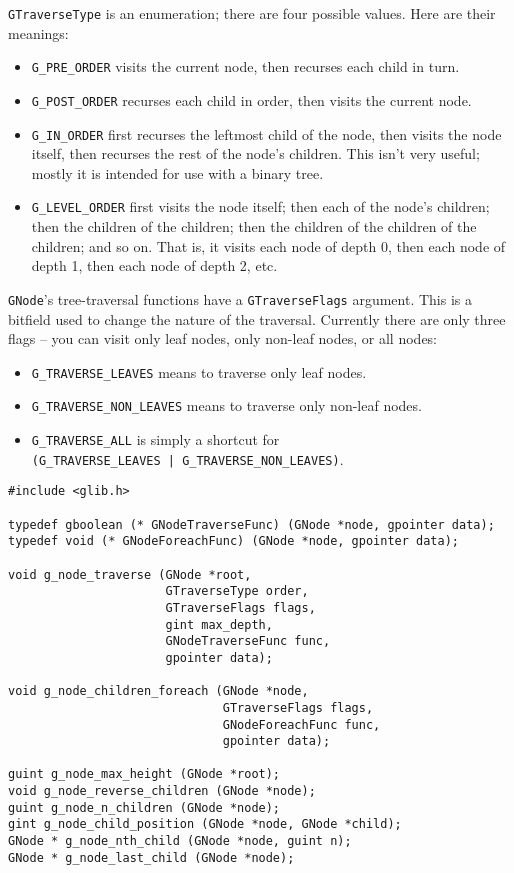 \lstinline{GTraverseType} is an enumeration; there are four possible values. Here are their meanings:
\begin{itemize}
  \item \lstinline{G_PRE_ORDER} visits the current node, then recurses each child in turn.

  \item \lstinline{G_POST_ORDER} recurses each child in order, then visits the current node.

  \item \lstinline{G_IN_ORDER} first recurses the leftmost child of the node, then visits the node itself, then recurses the rest of the node's children. This isn't very useful; mostly it is intended for use with a binary tree.

  \item \lstinline{G_LEVEL_ORDER} first visits the node itself; then each of the node's children; then the children of the children; then the children of the children of the children; and so on. That is, it visits each node of depth 0, then each node of depth 1, then each node of depth 2, etc.
\end{itemize}

\lstinline{GNode}'s tree-traversal functions have a \lstinline{GTraverseFlags} argument. This is a bitfield used to change the nature of the traversal. Currently there are only three flags -- you can visit only leaf nodes, only non-leaf nodes, or all nodes:
\begin{itemize}
  \item \lstinline{G_TRAVERSE_LEAVES} means to traverse only leaf nodes.
  \item \lstinline{G_TRAVERSE_NON_LEAVES} means to traverse only non-leaf nodes.
  \item \lstinline{G_TRAVERSE_ALL} is simply a shortcut for\\
    \lstinline{(G_TRAVERSE_LEAVES | G_TRAVERSE_NON_LEAVES)}.
\end{itemize}

\begin{lstlisting}[float, caption={Accessing a \lstinline{GNode}}, label=glib-nodeaccessors]
#include <glib.h>

typedef gboolean (* GNodeTraverseFunc) (GNode *node, gpointer data);
typedef void (* GNodeForeachFunc) (GNode *node, gpointer data);

void g_node_traverse (GNode *root,
                      GTraverseType order,
                      GTraverseFlags flags,
                      gint max_depth,
                      GNodeTraverseFunc func,
                      gpointer data);

void g_node_children_foreach (GNode *node,
                              GTraverseFlags flags,
                              GNodeForeachFunc func,
                              gpointer data);

guint g_node_max_height (GNode *root);
void g_node_reverse_children (GNode *node);
guint g_node_n_children (GNode *node);
gint g_node_child_position (GNode *node, GNode *child);
GNode * g_node_nth_child (GNode *node, guint n);
GNode * g_node_last_child (GNode *node);
\end{lstlisting}

